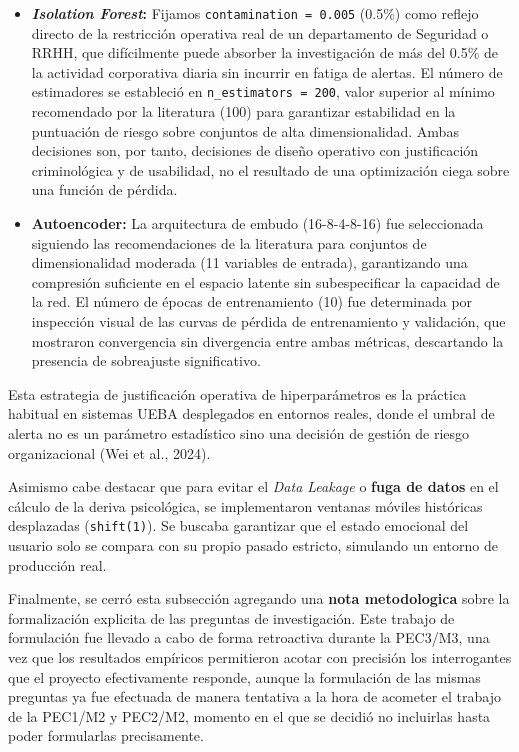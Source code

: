 \documentclass[IB]{TFUOC}%
\begin{document}
\begin{itemize}
    \item \textbf{\textit{Isolation Forest}:} Fijamos \texttt{contamination = 0.005} (0.5\%) como reflejo directo de la restricción operativa real de un departamento de Seguridad o RRHH, que difícilmente puede absorber la investigación de más del 0.5\% de la actividad corporativa diaria sin incurrir en fatiga de alertas. El número de estimadores se estableció en \texttt{n\_estimators = 200}, valor superior al mínimo recomendado por la literatura (100) para garantizar estabilidad en la puntuación de riesgo sobre conjuntos de alta dimensionalidad. Ambas decisiones son, por tanto, decisiones de diseño operativo con justificación criminológica y de usabilidad, no el resultado de una optimización ciega sobre una función de pérdida.
    
    \item \textbf{Autoencoder:} La arquitectura de embudo (16-8-4-8-16) fue seleccionada siguiendo las recomendaciones de la literatura para conjuntos de dimensionalidad moderada (11 variables de entrada), garantizando una compresión suficiente en el espacio latente sin subespecificar la capacidad de la red. El número de épocas de entrenamiento (10) fue determinada por inspección visual de las curvas de pérdida de entrenamiento y validación, que mostraron convergencia sin divergencia entre ambas métricas, descartando la presencia de sobreajuste significativo.
\end{itemize}

\noindent Esta estrategia de justificación operativa de hiperparámetros es la práctica habitual en sistemas UEBA desplegados en entornos reales, donde el umbral de alerta no es un parámetro estadístico sino una decisión de gestión de riesgo organizacional (Wei et al., 2024).

\medskip
\noindent Asimismo cabe destacar que para evitar el \textit{Data Leakage} o \textbf{fuga de datos} en el cálculo de la deriva psicológica, se implementaron ventanas móviles históricas desplazadas (\texttt{shift(1)}). Se buscaba garantizar que el estado emocional del usuario solo se compara con su propio pasado estricto, simulando un entorno de producción real.

\medskip
\noindent Finalmente, se cerró esta subsección agregando una \textbf{nota metodologica} sobre la formalización explicita de las preguntas de investigación. Este trabajo de formulación fue llevado a cabo de forma retroactiva durante la PEC3/M3, una vez que los resultados empíricos permitieron acotar con precisión los interrogantes que el proyecto efectivamente responde, aunque la formulación de las mismas preguntas ya fue efectuada de manera tentativa a la hora de acometer el trabajo de la PEC1/M2 y PEC2/M2, momento en el que se decidió no incluirlas hasta poder formularlas precisamente.
\end{document}
